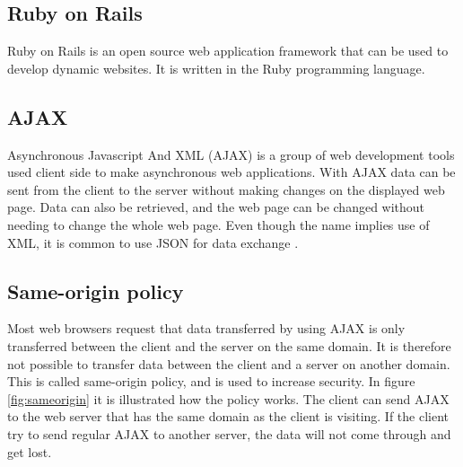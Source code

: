 \documentclass[10pt,a4paper]{article}
\begin{document}
\subsection{Ruby on Rails}
Ruby on Rails is an open source web application framework that can be used to develop dynamic websites. It is written in the Ruby programming language. \cite{rubyrails}

\subsection{AJAX}
Asynchronous Javascript And XML (AJAX) is a group of web development tools used client side to make asynchronous web applications. With AJAX data can be sent from the client to the server without making changes on the displayed web page. Data can also be retrieved, and the web page can be changed without needing to change the whole web page. Even though the name implies use of XML, it is common to use JSON for data exchange \cite{ajax}.



\subsection{Same-origin policy}
Most web browsers request that data transferred by using AJAX is only transferred between the client and the server on the same domain. It is therefore not possible to transfer data between the client and a server on another domain. This is called same-origin policy, and is used to increase security. In figure \ref{fig:sameorigin} it is illustrated how the policy works. The client can send AJAX to the web server that has the same domain as the client is visiting. If the client try to send regular AJAX to another server, the data will not come through and get lost. \cite{sameorigin}
\end{document}
